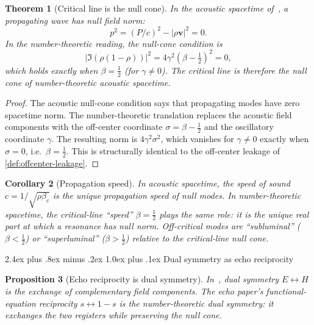 \documentclass[11pt,a4paper]{article}
\makeatletter
\theoremstyle{plain}
\newtheorem{theorem}{Theorem}[section]
\newtheorem{proposition}[theorem]{Proposition}
\newtheorem{corollary}[theorem]{Corollary}
\theoremstyle{definition}
\theoremstyle{remark}
\numberwithin{equation}{section}
\renewcommand{\subsection}{%
  \@startsection{subsection}{2}{0pt}%
    {2.4ex plus .8ex minus .2ex}%
    {1.0ex plus .1ex}%
    {\normalfont\Large\bfseries\color{headingAccent}}%
}
\makeatother
\begin{document}
\begin{theorem}[Critical line is the null cone]
\label{thm:null-cone}
In the acoustic spacetime of~\cite{burns2024}, a propagating wave has null
field norm:
\[
  p^2=(P/c)^2-|\rho\mathbf{v}|^2=0.
\]
In the number-theoretic reading, the null-cone condition is
\[
  |\Im(\rho(1-\rho))|^2=4\gamma^2(\beta-\tfrac12)^2=0,
\]
which holds exactly when \(\beta=\tfrac12\) (for \(\gamma\ne0\)).
The critical line is therefore the null cone of number-theoretic
acoustic spacetime.
\end{theorem}

\begin{proof}
The acoustic null-cone condition says that propagating modes have
zero spacetime norm.  The number-theoretic translation replaces the
acoustic field components with the off-center coordinate
\(\sigma=\beta-\tfrac12\) and the oscillatory coordinate \(\gamma\).
The resulting norm is \(4\gamma^2\sigma^2\), which vanishes for
\(\gamma\ne0\) exactly when \(\sigma=0\), i.e.~\(\beta=\tfrac12\).
This is structurally identical to the off-center leakage of
\cref{def:offcenter-leakage}.
\end{proof}

\begin{corollary}[Propagation speed]
\label{cor:propagation-speed}
In acoustic spacetime, the speed of sound \(c=1/\sqrt{\rho\beta_c}\)
is the unique propagation speed of null modes.  In number-theoretic
spacetime, the critical-line ``speed'' \(\beta=\tfrac12\) plays the
same role: it is the unique real part at which a resonance has null
norm.  Off-critical modes are ``subluminal'' (\(\beta<\tfrac12\)) or
``superluminal'' (\(\beta>\tfrac12\)) relative to the critical-line
null cone.
\end{corollary}

\subsection{Dual symmetry as echo reciprocity}

\begin{proposition}[Echo reciprocity is dual symmetry]
\label{prop:dual-symmetry}
In~\cite{burns2024}, dual symmetry \(E\leftrightarrow H\) is the
exchange of complementary field components.  The echo paper's
functional-equation reciprocity \(s\leftrightarrow1-s\) is the
number-theoretic dual symmetry: it exchanges the two registers while
preserving the null cone.
\end{proposition}
\end{document}

